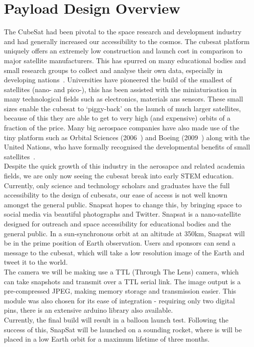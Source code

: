 \section{Payload Design Overview}
The CubeSat had been pivotal to the space research and development industry and had generally increased our accessibility to the cosmos. The cubesat platform uniquely offers an extremely low construction and launch cost in comparison to major satellite manufacturers. This has spurred on many educational bodies and small research groups to collect and analyse their own data, especially in developing nations~\cite{woeller}. Universities have pioneered the build of the smallest of satellites (nano- and pico-), this has been assisted with the miniaturisation in many technological fields such as electronics, materials ans sensors. These small sizes enable the cubesat to `piggy-back' on the launch of much larger satellites, because of this they are able to get to very high (and expensive) orbits of a fraction of the price. Many big aerospace companies have also made use of the tiny platform such as Orbital Sciences (2006~\cite{heidt}) and Boeing (2009~\cite{straub}) along with the United Nations, who have formally recognised the developmental benefits of small satellites~\cite{rycroft}. \\

\noindent
Despite the quick growth of this industry in the aerosapce and related academia fields, we are only now seeing the cubesat break into early STEM education. Currently, only science and technology scholars and graduates have the full accessibility to the design of cubesats, our ease of access is not well known amongst the general public. Snapsat hopes to change this, by bringing space to social media via beautiful photographs and Twitter. Snapsat is a nano-satellite designed for outreach and space accessibility for educational bodies and the general public. In a sun-synchronous orbit at an altitude at 350km, Snapsat will be in the prime position of Earth observation. Users and sponsors can send a message to the cubesat, which will take a low resolution image of the Earth and tweet it to the world. \\

\noindent
The camera we will be making use a TTL (Through The Lens) camera, which can take snapshots and transmit over a TTL serial link. The image output is a pre-compressed JPEG, making memory storage and transmission easier. This module was also chosen for its ease of integration - requiring only two digital pins, there is an extensive arduino library also available. \\

\noindent
Currently, the final build will result in a balloon launch test. Following the success of this, SnapSat will be launched on a sounding rocket, where is will be placed in a low Earth orbit for a maximum lifetime of three months.